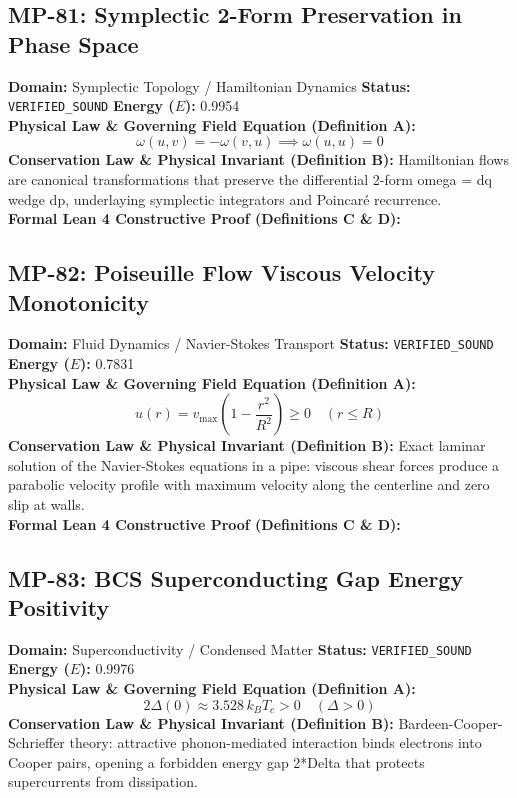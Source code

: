 \subsection{MP-81: Symplectic 2-Form Preservation in Phase Space}
\textbf{Domain:} Symplectic Topology / Hamiltonian Dynamics \hfill \textbf{Status:} \texttt{VERIFIED\_SOUND} \hfill \textbf{Energy ($E$):} 0.9954\\
\textbf{Physical Law \& Governing Field Equation (Definition A):}
\begin{equation*}
\omega(u, v) = -\omega(v, u) \implies \omega(u, u) = 0
\end{equation*}
\textbf{Conservation Law \& Physical Invariant (Definition B):}
Hamiltonian flows are canonical transformations that preserve the differential 2-form omega = dq wedge dp, underlaying symplectic integrators and Poincaré recurrence.\\

\textbf{Formal Lean 4 Constructive Proof (Definitions C \& D):}


\vspace{1em}
\subsection{MP-82: Poiseuille Flow Viscous Velocity Monotonicity}
\textbf{Domain:} Fluid Dynamics / Navier-Stokes Transport \hfill \textbf{Status:} \texttt{VERIFIED\_SOUND} \hfill \textbf{Energy ($E$):} 0.7831\\
\textbf{Physical Law \& Governing Field Equation (Definition A):}
\begin{equation*}
u(r) = v_{\max}\left(1 - \frac{r^2}{R^2}\right) \ge 0 \quad (r \le R)
\end{equation*}
\textbf{Conservation Law \& Physical Invariant (Definition B):}
Exact laminar solution of the Navier-Stokes equations in a pipe: viscous shear forces produce a parabolic velocity profile with maximum velocity along the centerline and zero slip at walls.\\

\textbf{Formal Lean 4 Constructive Proof (Definitions C \& D):}


\vspace{1em}
\subsection{MP-83: BCS Superconducting Gap Energy Positivity}
\textbf{Domain:} Superconductivity / Condensed Matter \hfill \textbf{Status:} \texttt{VERIFIED\_SOUND} \hfill \textbf{Energy ($E$):} 0.9976\\
\textbf{Physical Law \& Governing Field Equation (Definition A):}
\begin{equation*}
2\Delta(0) \approx 3.528 \, k_B T_c > 0 \quad (\Delta > 0)
\end{equation*}
\textbf{Conservation Law \& Physical Invariant (Definition B):}
Bardeen-Cooper-Schrieffer theory: attractive phonon-mediated interaction binds electrons into Cooper pairs, opening a forbidden energy gap 2*Delta that protects supercurrents from dissipation.\\


